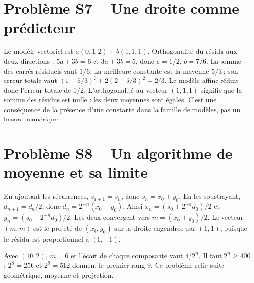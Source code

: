 \section*{Problème S7 -- Une droite comme prédicteur}

Le modèle vectoriel est $a(0,1,2)+b(1,1,1)$.
Orthogonalité du résidu aux deux directions :
$5a+3b=6$ et $3a+3b=5$, donc $a=1/2$, $b=7/6$.
La somme des carrés résiduels vaut $1/6$.
La meilleure constante est la moyenne $5/3$ ; son erreur totale vaut
$(1-5/3)^2+2(2-5/3)^2=2/3$.
Le modèle affine réduit donc l'erreur totale de $1/2$.
L'orthogonalité au vecteur $(1,1,1)$ signifie que la somme des résidus est
nulle : les deux moyennes sont égales. C'est une conséquence de la présence
d'une constante dans la famille de modèles, pas un hasard numérique.

\section*{Problème S8 -- Un algorithme de moyenne et sa limite}

En ajoutant les récurrences, $s_{n+1}=s_n$, donc $s_n=x_0+y_0$.
En les soustrayant, $d_{n+1}=d_n/2$, donc $d_n=2^{-n}(x_0-y_0)$.
Ainsi $x_n=(s_0+2^{-n}d_0)/2$ et $y_n=(s_0-2^{-n}d_0)/2$.
Les deux convergent vers $m=(x_0+y_0)/2$.
Le vecteur $(m,m)$ est le projeté de $(x_0,y_0)$ sur la droite engendrée
par $(1,1)$, puisque le résidu est proportionnel à $(1,-1)$.

Avec $(10,2)$, $m=6$ et l'écart de chaque composante vaut $4/2^n$.
Il faut $2^n\ge400$ ; $2^8=256$ et $2^9=512$ donnent le premier rang $9$.
Ce problème relie suite géométrique, moyenne et projection.
